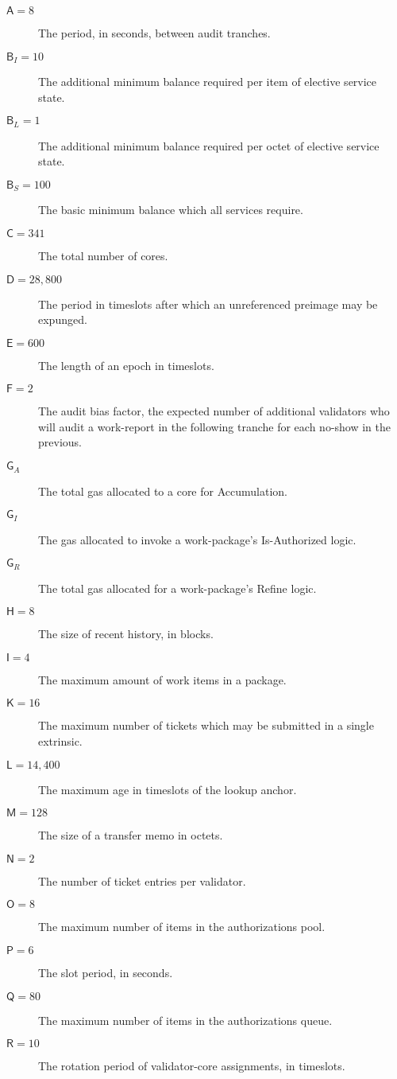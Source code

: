 \begin{description}
  \item[$\mathsf{A} = 8$] The period, in seconds, between audit tranches.
  \item[$\mathsf{B}_I = 10$] The additional minimum balance required per item of elective service state.
  \item[$\mathsf{B}_L = 1$] The additional minimum balance required per octet of elective service state.
  \item[$\mathsf{B}_S = 100$] The basic minimum balance which all services require.
  \item[$\mathsf{C} = 341$] The total number of cores.
  \item[$\mathsf{D} = 28,800$] The period in timeslots after which an unreferenced preimage may be expunged.
  \item[$\mathsf{E} = 600$] The length of an epoch in timeslots.
  \item[$\mathsf{F} = 2$] The audit bias factor, the expected number of additional validators who will audit a work-report in the following tranche for each no-show in the previous.
  \item[$\mathsf{G}_A$] The total gas allocated to a core for Accumulation.
  \item[$\mathsf{G}_I$] The gas allocated to invoke a work-package's Is-Authorized logic.
  \item[$\mathsf{G}_R$] The total gas allocated for a work-package's Refine logic.
  \item[$\mathsf{H} = 8$] The size of recent history, in blocks.
  \item[$\mathsf{I} = 4$] The maximum amount of work items in a package.
  \item[$\mathsf{K} = 16$] The maximum number of tickets which may be submitted in a single extrinsic.
  \item[$\mathsf{L} = 14,400$] The maximum age in timeslots of the lookup anchor.
  \item[$\mathsf{M} = 128$] The size of a transfer memo in octets.
  \item[$\mathsf{N} = 2$] The number of ticket entries per validator.
  \item[$\mathsf{O} = 8$] The maximum number of items in the authorizations pool.
  \item[$\mathsf{P} = 6$] The slot period, in seconds.
  \item[$\mathsf{Q} = 80$] The maximum number of items in the authorizations queue.
  \item[$\mathsf{R} = 10$] The rotation period of validator-core assignments, in timeslots.

\end{description}

